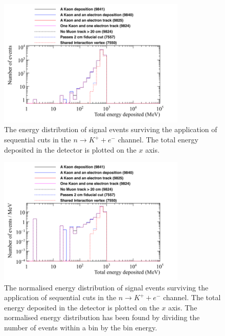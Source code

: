 \begin{figure}
  \centering
  \includegraphics[width=0.8\textwidth]{NucleonDecay_EnergyDepCuts_Raw_2cmCut}
  \caption[The energy distribution of signal events surviving the application of sequential cuts in the $n \rightarrow K^{+} + e^{-}$ channel]
          {The energy distribution of signal events surviving the application of sequential cuts in the $n \rightarrow K^{+} + e^{-}$ channel. The total energy deposited in the detector is plotted on the $x$ axis.}
  \label{fig:NDK_Sig_Raw}
\end{figure}

\begin{figure}
  \centering
  \includegraphics[width=0.8\textwidth]{NucleonDecay_EnergyDepCuts_Norm_2cmCut}
  \caption[The normalised energy distribution of signal events surviving the application of sequential cuts in the $n \rightarrow K^{+} + e^{-}$ channel]
          {The normalised energy distribution of signal events surviving the application of sequential cuts in the $n \rightarrow K^{+} + e^{-}$ channel. The total energy deposited in the detector is plotted on the $x$ axis. The normalised energy distribution has been found by dividing the number of events within a bin by the bin energy.}
  \label{fig:NDK_Sig_Norm}
\end{figure}

